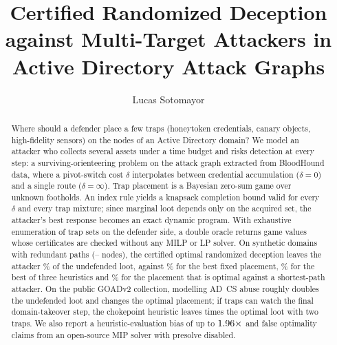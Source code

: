\documentclass[runningheads]{llncs}
\begin{document}
\title{Certified Randomized Deception against Multi-Target Attackers in Active Directory Attack Graphs}
\author{Lucas Sotomayor}

\maketitle

\begin{abstract}
Where should a defender place a few traps (honeytoken credentials, canary objects, high-fidelity sensors) on the nodes of an Active Directory domain? We model an attacker who collects several assets under a time budget and risks detection at every step: a surviving-orienteering problem on the attack graph extracted from BloodHound data, where a pivot-switch cost $\delta$ interpolates between credential accumulation ($\delta=0$) and a single route ($\delta=\infty$). Trap placement is a Bayesian zero-sum game over unknown footholds. An index rule yields a knapsack completion bound valid for every $\delta$ and every trap mixture; since marginal loot depends only on the acquired set, the attacker's best response becomes an exact dynamic program. With exhaustive enumeration of trap sets on the defender side, a double oracle returns game values whose certificates are checked without any MILP or LP solver. On \NMain{} synthetic domains with redundant paths (\NodesMinMain--\NodesMaxMain{} nodes), the certified optimal randomized deception leaves the attacker \MixMean\% of the undefended loot, against \VisMean\% for the best fixed placement, \HeurMean\% for the best of three heuristics and \SpMean\% for the placement that is optimal against a shortest-path attacker. On the public GOADv2 collection, modelling AD~CS abuse roughly doubles the undefended loot and changes the optimal placement; if traps can watch the final domain-takeover step, the chokepoint heuristic leaves \GoadChokeOverMixTwo{} times the optimal loot with two traps. We also report a heuristic-evaluation bias of up to $1.96\times$ and false optimality claims from an open-source MIP solver with presolve disabled.
\end{abstract}

\end{document}

